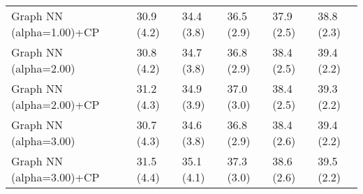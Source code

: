 \documentclass{article}
\begin{document}
\begin{table*}[t!]
\begin{center}
\begin{small}
\begin{sc}
\begin{tabular}{llllll}
Graph NN (alpha=1.00)+CP&30.9 (4.2)      &34.4 (3.8)      &36.5 (2.9)      &37.9 (2.5)      &38.8 (2.3)      \\
Graph NN (alpha=2.00)&30.8 (4.2)      &34.7 (3.8)      &36.8 (2.9)      &38.4 (2.5)      &39.4 (2.2)      \\
Graph NN (alpha=2.00)+CP&31.2 (4.3)      &34.9 (3.9)      &37.0 (3.0)      &38.4 (2.5)      &39.3 (2.2)      \\
Graph NN (alpha=3.00)&30.7 (4.3)      &34.6 (3.8)      &36.8 (2.9)      &38.4 (2.6)      &39.4 (2.2)      \\
Graph NN (alpha=3.00)+CP&31.5 (4.4)      &35.1 (4.1)      &37.3 (3.0)      &38.6 (2.6)      &39.5 (2.2)      \\
\bottomrule
\end{tabular}
\end{sc}
\end{small}
\end{center}
\vskip -0.1in
\end{table*}
\end{document}
